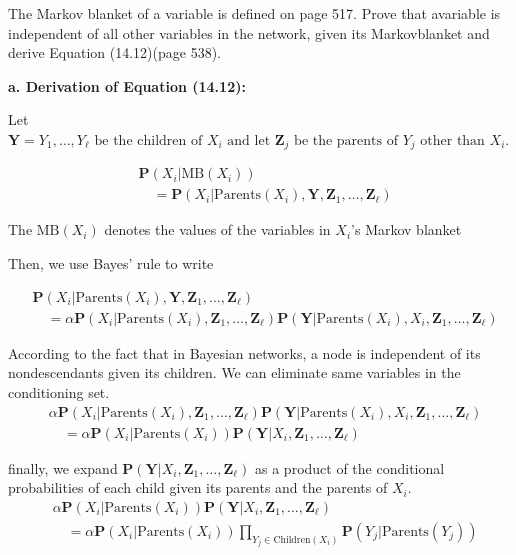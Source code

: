 \documentclass[cn,12pt]{homework}
\begin{document}
\newpage

\begin{problem}
The Markov blanket of a variable is defined on page 517. Prove that avariable is independent of all other variables in the network, given its Markovblanket and derive Equation (14.12)(page 538).
\end{problem}

\begin{solution}
  \quad


\textbf{a. Derivation of Equation (14.12):}

 Let $ \mathbf{Y} = Y_1, \ldots, Y_\ell \text{ be the children of } X_i \text{ and let } \mathbf{Z}_j \text{ be the parents of } Y_j \text{ other than } X_i. $ 

 \begin{align*}
&\mathbf{P}(X_i | \text{MB}(X_i)) \\
&\quad = \mathbf{P}(X_i | \text{Parents}(X_i), \mathbf{Y}, \mathbf{Z}_1, \ldots, \mathbf{Z}_\ell) 
\end{align*}

The $\text{MB}(X_i)$ denotes the values of the variables in $X_i$’s Markov blanket

Then, we use Bayes’ rule to write

 \begin{align*}
&\mathbf{P}(X_i | \text{Parents}(X_i), \mathbf{Y}, \mathbf{Z}_1, \ldots, \mathbf{Z}_\ell) \\
&\quad = \alpha \mathbf{P}(X_i | \text{Parents}(X_i), \mathbf{Z}_1, \ldots, \mathbf{Z}_\ell) \mathbf{P}(\mathbf{Y} | \text{Parents}(X_i), X_i, \mathbf{Z}_1, \ldots, \mathbf{Z}_\ell)
\end{align*}

According to the fact that in Bayesian networks, a node is
independent of its nondescendants given its children. We can eliminate same variables in the conditioning set.
 \begin{align*}
&\alpha \mathbf{P}(X_i | \text{Parents}(X_i), \mathbf{Z}_1, \ldots, \mathbf{Z}_\ell) \mathbf{P}(\mathbf{Y} | \text{Parents}(X_i), X_i, \mathbf{Z}_1, \ldots, \mathbf{Z}_\ell) \\
&\quad = \alpha \mathbf{P}(X_i | \text{Parents}(X_i)) \mathbf{P}(\mathbf{Y} | X_i, \mathbf{Z}_1, \ldots, \mathbf{Z}_\ell) 
\end{align*}

finally, we expand  $\mathbf{P}(\mathbf{Y} | X_i, \mathbf{Z}_1, \ldots, \mathbf{Z}_\ell) $ as a product of the conditional probabilities of each child given its parents and the parents of $X_i$.
 \begin{align*}
&\alpha \mathbf{P}(X_i | \text{Parents}(X_i)) \mathbf{P}(\mathbf{Y} | X_i, \mathbf{Z}_1, \ldots, \mathbf{Z}_\ell)  \\
&\quad = \alpha \mathbf{P}(X_i | \text{Parents}(X_i)) \prod_{Y_j \in \text{Children}(X_i)} \mathbf{P}(Y_j | \text{Parents}(Y_j)) \tag{14.12} \\
\end{align*}


\end{solution}
\end{document}

